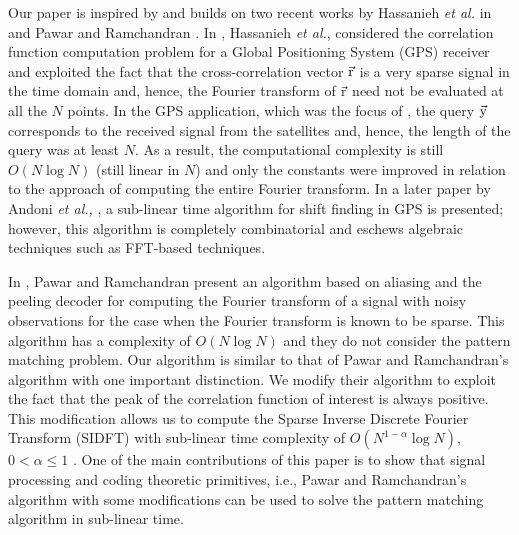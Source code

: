 Our paper is inspired by and builds on two recent works by Hassanieh {\em {et al.}} in \cite{hassanieh2012faster} and Pawar and Ramchandran \cite{pawar2014robust}. In \cite{hassanieh2012faster}, Hassanieh \emph{et al.}, considered the correlation function computation problem for a Global Positioning System (GPS) receiver and exploited the fact that the cross-correlation vector $\vec{\mathrm{r}}$ is a very sparse signal in the time domain and, hence, the Fourier transform of $\vec{\mathrm{r}}$ need not be evaluated at all the $N$ points. In the GPS application, which was the focus of \cite{hassanieh2012faster}, the query $\vec{\mathrm{y}}$ corresponds to the received signal from the satellites and, hence, the length of the query was at least $N$. As a result, the computational complexity is still $O(N \log N)$ (still linear in $N$) and only the constants were improved in relation to the approach of computing the entire Fourier transform. In a later paper by Andoni {\em et al.,} \cite{andoni2013shift}, a sub-linear time algorithm for shift finding in GPS is presented; however, this algorithm is completely combinatorial and eschews algebraic techniques such as FFT-based techniques.

In \cite{pawar2014robust}, Pawar and Ramchandran present an algorithm based on aliasing and the peeling decoder for computing the Fourier transform of a signal with noisy observations for the case when the Fourier transform is known to be sparse. This algorithm has a complexity of $O(N \log N)$ and they do not consider the pattern matching problem. Our algorithm is similar to that of Pawar and Ramchandran's algorithm with one important distinction. We modify their algorithm to exploit the fact that the peak of the correlation function of interest is always positive. This modification allows us to compute the Sparse Inverse Discrete Fourier Transform (SIDFT) with sub-linear time complexity of $O(N^{1-\alpha} \log N)$, $0 < \alpha \leq 1$ . One of the main contributions of this paper is to show that signal processing and coding theoretic primitives, i.e., Pawar and Ramchandran's algorithm with some modifications can be used to solve the pattern matching algorithm in sub-linear time.
